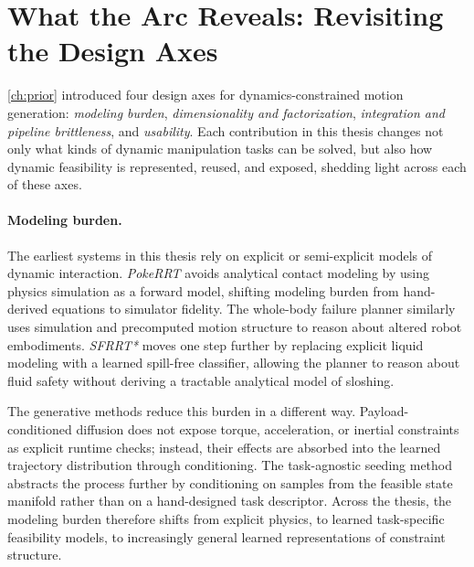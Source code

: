 \section{What the Arc Reveals: Revisiting the Design Axes}
\label{sec:discussion:axes}

\cref{ch:prior} introduced four design axes for dynamics-constrained motion generation: \textit{modeling burden}, \textit{dimensionality and factorization}, \textit{integration and pipeline brittleness}, and \textit{usability}.
Each contribution in this thesis changes not only what kinds of dynamic manipulation tasks can be solved, but also how dynamic feasibility is represented, reused, and exposed, shedding light across each of these axes.

\paragraph{Modeling burden.}
The earliest systems in this thesis rely on explicit or semi-explicit models of dynamic interaction.
\textit{PokeRRT} avoids analytical contact modeling by using physics simulation as a forward model, shifting modeling burden from hand-derived equations to simulator fidelity.
The whole-body failure planner similarly uses simulation and precomputed motion structure to reason about altered robot embodiments.
\textit{SFRRT*} moves one step further by replacing explicit liquid modeling with a learned spill-free classifier, allowing the planner to reason about fluid safety without deriving a tractable analytical model of sloshing.

The generative methods reduce this burden in a different way.
Payload-conditioned diffusion does not expose torque, acceleration, or inertial constraints as explicit runtime checks; instead, their effects are absorbed into the learned trajectory distribution through conditioning.
The task-agnostic seeding method abstracts the process further by conditioning on samples from the feasible state manifold rather than on a hand-designed task descriptor.
Across the thesis, the modeling burden therefore shifts from explicit physics, to learned task-specific feasibility models, to increasingly general learned representations of constraint structure.


